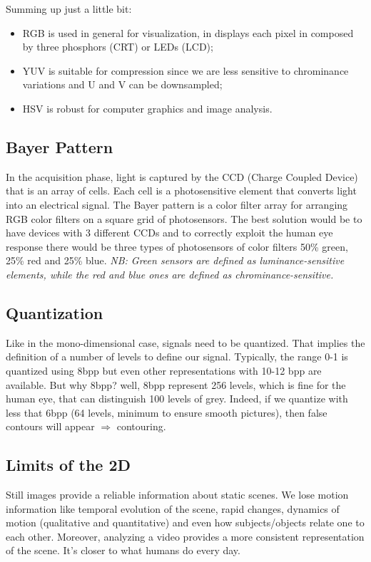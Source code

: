 Summing up just a little bit:
\begin{itemize}
    \item RGB is used in general for visualization, in displays each pixel in composed by three phosphors (CRT) or LEDs (LCD);
    \item YUV is suitable for compression since we are less sensitive to chrominance variations and U and V can be downsampled;
    \item HSV is robust for computer graphics and image analysis.
\end{itemize}

\subsection{Bayer Pattern}
In the acquisition phase, light is captured by the CCD (Charge Coupled Device) that is an array of cells. Each cell is a photosensitive element that converts light into an electrical signal.
The Bayer pattern is a color filter array for arranging RGB color filters on a square grid of photosensors. The best solution would be to have devices with 3 different CCDs and to correctly exploit the human eye response there would be three types of photosensors of color filters 50\% green, 25\% red and 25\% blue.
\textit{NB: Green sensors are defined as luminance-sensitive elements, while the red and blue ones are defined as chrominance-sensitive.}
\subsection{Quantization}
Like in the mono-dimensional case, signals need to be quantized. That implies the definition of a number of levels to define our signal. Typically, the range 0-1 is quantized using 8bpp but even other representations with 10-12 bpp are available.
But why 8bpp? well, 8bpp represent 256 levels, which is fine for the human eye, that can distinguish 100 levels of grey. Indeed, if we quantize with less that 6bpp (64 levels, minimum to ensure smooth pictures), then false contours will appear $\Rightarrow$ contouring.
\\
\subsection{Limits of the 2D}
Still images provide a reliable information about static scenes.
We lose motion information like temporal evolution of the scene, rapid changes, dynamics of motion (qualitative and quantitative) and even how subjects/objects relate one to each other.
Moreover, analyzing a video provides a more consistent representation of the scene.
It’s closer to what humans do every day.

